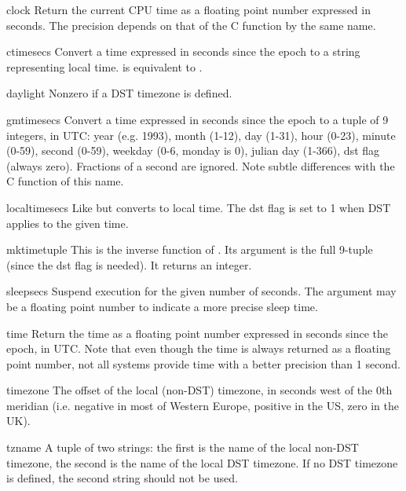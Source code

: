 \begin{funcdesc}{clock}{}
Return the current CPU time as a floating point number expressed in
seconds.  The precision depends on that of the C function by the same
name.
\end{funcdesc}


\begin{funcdesc}{ctime}{secs}
Convert a time expressed in seconds since the epoch to a string
representing local time.   is equivalent to
.
\end{funcdesc}

\begin{datadesc}{daylight}
Nonzero if a DST timezone is defined.
\end{datadesc}

\begin{funcdesc}{gmtime}{secs}
Convert a time expressed in seconds since the epoch to a tuple of 9
integers, in UTC: year (e.g. 1993), month (1-12), day (1-31), hour
(0-23), minute (0-59), second (0-59), weekday (0-6, monday is 0),
julian day (1-366), dst flag (always zero).  Fractions of a second are
ignored.  Note subtle differences with the C function of this name.
\end{funcdesc}

\begin{funcdesc}{localtime}{secs}
Like  but converts to local time.  The dst flag is set
to 1 when DST applies to the given time.
\end{funcdesc}

\begin{funcdesc}{mktime}{tuple}
This is the inverse function of .  Its argument is the
full 9-tuple (since the dst flag is needed).  It returns an integer.
\end{funcdesc}

\begin{funcdesc}{sleep}{secs}
Suspend execution for the given number of seconds.  The argument may
be a floating point number to indicate a more precise sleep time.
\end{funcdesc}

\begin{funcdesc}{time}{}
Return the time as a floating point number expressed in seconds since
the epoch, in UTC.  Note that even though the time is always returned
as a floating point number, not all systems provide time with a better
precision than 1 second.
\end{funcdesc}

\begin{datadesc}{timezone}
The offset of the local (non-DST) timezone, in seconds west of the 0th
meridian (i.e. negative in most of Western Europe, positive in the US,
zero in the UK).
\end{datadesc}

\begin{datadesc}{tzname}
A tuple of two strings: the first is the name of the local non-DST
timezone, the second is the name of the local DST timezone.  If no DST
timezone is defined, the second string should not be used.
\end{datadesc}
